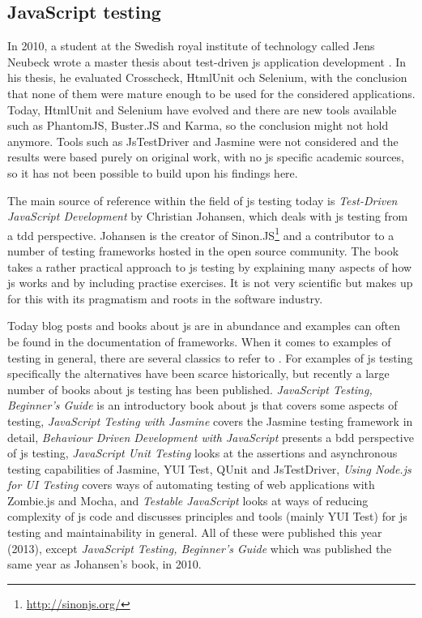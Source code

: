 \documentclass[11pt]{article}
\begin{document}
\subsection{JavaScript testing}
\label{subsec:previousworkjs}

In 2010, a student at the Swedish royal institute of technology called Jens Neubeck wrote a master thesis about test-driven \gls{js} application development \cite{Neubeck}. In his thesis, he evaluated Crosscheck, HtmlUnit och Selenium, with the conclusion that none of them were mature enough to be used for the considered applications. Today, HtmlUnit and Selenium have evolved and there are new tools available such as PhantomJS, Buster.JS and Karma, so the conclusion might not hold anymore. Tools such as JsTestDriver and Jasmine were not considered and the results were based purely on original work, with no \gls{js} specific academic sources, so it has not been possible to build upon his findings here.

The main source of reference within the field of \gls{js} testing today is \emph{Test-Driven JavaScript Development} \cite{Tddjs} by Christian Johansen, which deals with \gls{js} testing from a \gls{tdd} perspective. Johansen is the creator of Sinon.JS\footnote{\url{http://sinonjs.org/}} and a contributor to a number of testing frameworks hosted in the open source community. The book takes a rather practical approach to \gls{js} testing by explaining many aspects of how \gls{js} works and by including practise exercises. It is not very scientific but makes up for this with its pragmatism and roots in the software industry.

Today blog posts and books about \gls{js} are in abundance and examples can often be found in the documentation of frameworks. When it comes to examples of testing in general, there are several classics to refer to \cite{KentBeck}\cite{TestPatterns}. For examples of \gls{js} testing specifically the alternatives have been scarce historically, but recently a large number of books about \gls{js} testing has been published. \emph{JavaScript Testing, Beginner's Guide} \cite{JSBeginners} is an introductory book about \gls{js} that covers some aspects of testing, \emph{JavaScript Testing with Jasmine} \cite{JasmineBook} covers the Jasmine testing framework in detail, \emph{Behaviour Driven Development with JavaScript} \cite{BDDJS} presents a \gls{bdd} perspective of \gls{js} testing, \emph{JavaScript Unit Testing} \cite{JSUT} looks at the assertions and asynchronous testing capabilities of Jasmine, YUI Test, QUnit and JsTestDriver, \emph{Using Node.js for UI Testing} \cite{UsingNode} covers ways of automating testing of web applications with Zombie.js and Mocha, and \emph{Testable JavaScript} \cite{TestableJS} looks at ways of reducing complexity of \gls{js} code and discusses principles and tools (mainly YUI Test) for \gls{js} testing and maintainability in general. All of these were published this year (2013), except \emph{JavaScript Testing, Beginner's Guide} which was published the same year as Johansen's book, in 2010.
\end{document}
